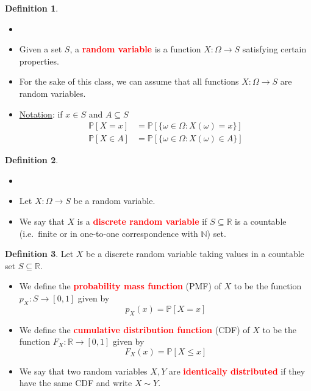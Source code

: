\documentclass{article}
\newcommand{\PP}{\mathbb{P}}
\newcommand{\R}{\mathbb{R}}
\newcommand{\N}{\mathbb{N}}
\newcommand{\bfred}[1]{\textcolor{red}{\textbf{#1}}}
\theoremstyle{plain}
\theoremstyle{definition}
\newtheorem{defn}{Definition}[section]
\theoremstyle{remark}
\begin{document}
\begin{defn}
    \begin{itemize}
        \item []
        \item Given a set $S$, a \bfred{random variable} is a function $X: \Omega \rightarrow S$ satisfying certain properties.
        \item For the sake of this class, we can assume that all functions $X: \Omega \rightarrow S$ are random variables.
        \item \underline{Notation}: if $x \in S$ and $A \subseteq S$
        \begin{align*}
            \PP[X = x] &= \PP[\{\omega \in \Omega : X(\omega) = x\}] \\
            \PP[X \in A] &= \PP[\{\omega \in \Omega : X(\omega) \in A\}]
        \end{align*}
    \end{itemize}
\end{defn}

\begin{defn}
    \begin{itemize}
        \item []
        \item Let $X: \Omega \rightarrow S$ be a random variable.
        \item We say that $X$ is a \bfred{discrete random variable} if $S \subseteq \R$ is a countable (i.e.\ finite or in one-to-one correspondence with $\N$) set.
    \end{itemize}
\end{defn}

\begin{defn}
    Let $X$ be a discrete random variable taking values in a countable set $S \subseteq \R$.
    \begin{itemize}
        \item We define the \bfred{probability mass function} (PMF) of $X$ to be the function $p_X: S \rightarrow [0, 1]$ given by \[p_X(x) = \PP[X = x]\]
        \item We define the \bfred{cumulative distribution function} (CDF) of $X$ to be the function $F_X: \R \rightarrow [0, 1]$ given by \[F_X(x) = \PP[X \leq x]\]
        \item We say that two random variables $X, Y$ are \bfred{identically distributed} if they have the same CDF and write $X \sim Y$.
    \end{itemize}
\end{defn}
\end{document}
